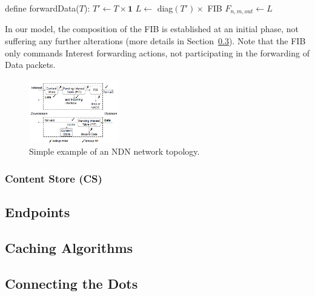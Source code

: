 \begin{algorithmic}[1]

\State define forwardData($T$):
\State
    \State $T' \leftarrow T \times \textbf{1}$
    \State $L \leftarrow$ diag$(T') \times$ FIB
    \State $F_{n,m,out} \leftarrow L$

\end{algorithmic}\shortvertbreak

In our model, the composition of the FIB is established at an initial phase, 
not suffering any further alterations (more details in 
Section~\ref{subsec:meth-conn-dots}). Note 
that the FIB only commands Interest forwarding actions, not participating in the 
forwarding of Data packets.\shortvertbreak

\begin{figure}[h!]

    \centering
    \includegraphics[width=0.35\textwidth]{figures/ndn-forwarding-engine.png}
    \cprotect\caption{Simple example of an NDN network topology.}
    \label{fig:fib-topo}

\end{figure}

\subsubsection{Content Store (CS)}
\label{subsec:meth-cs}

\subsection{Endpoints}
\label{subsec:meth-endpoints}

\subsection{Caching Algorithms}
\label{subsec:meth-caching-algs}

\subsection{Connecting the Dots}
\label{subsec:meth-conn-dots}
